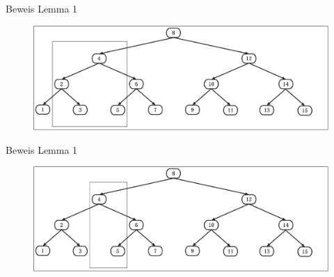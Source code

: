 \documentclass[11pt]{beamer}
\begin{document}
\begin{frame} {Beweis Lemma 1}
\begin{figure}[H]
	\centering
	\includegraphics[width=1\textwidth]{Medien/pres/linksRechts1}
\end{figure}
\end{frame}
\begin{frame} {Beweis Lemma 1}
	\begin{figure}[H]
		\centering
		\includegraphics[width=1\textwidth]{Medien/pres/linksRechts2}
	\end{figure}
\end{frame}
\end{document}
